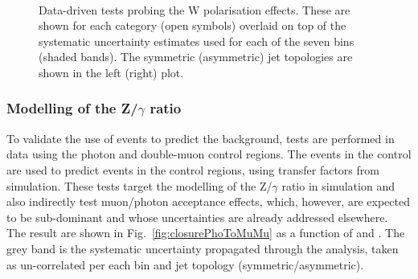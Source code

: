 \begin{figure}[h!]
  \begin{center}
    ~~
    \caption{Data-driven tests probing the W polarisation effects. 
      These are shown for each
      \njet category (open symbols) overlaid on top of the systematic
      uncertainty estimates used for each of the seven \scalht bins
      (shaded bands). 
      The symmetric (asymmetric) jet topologies are shown in the left (right) plot.       
    }
    \label{fig:closureMuPToMuM}
  \end{center} 
\end{figure}






\subsubsection*{Modelling of the Z/$\gamma$ ratio}
\label{sec:tfSyst_ZGratio}
To validate the use of \gj events to predict the \znunu
background, tests are performed in data using the photon and double-muon control regions. 
The events in the \gj control are used to predict events in the \mmj control regions, 
using transfer factors from simulation. 
These tests target the modelling of the Z/$\gamma$ ratio in simulation and 
also indirectly test muon/photon acceptance effects, which, however, 
are expected to be sub-dominant and whose uncertainties are already addressed elsewhere. \\
The result are shown in Fig.~\ref{fig:closurePhoToMuMu} as a function of \scalht and \njet. 
The grey band is the systematic uncertainty propagated through the analysis, 
taken as un-correlated per each \scalht bin and jet topology (symmetric/asymmetric).

